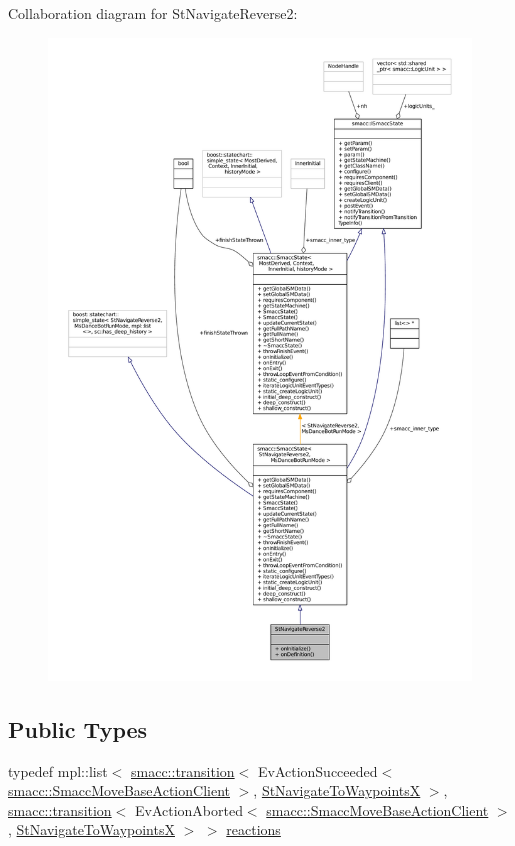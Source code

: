 Collaboration diagram for St\+Navigate\+Reverse2\+:
\nopagebreak
\begin{figure}[H]
\begin{center}
\leavevmode
\includegraphics[width=350pt]{structStNavigateReverse2__coll__graph}
\end{center}
\end{figure}
\subsection*{Public Types}
\begin{DoxyCompactItemize}
\item 
typedef mpl\+::list$<$ \hyperlink{classsmacc_1_1transition}{smacc\+::transition}$<$ Ev\+Action\+Succeeded$<$ \hyperlink{classsmacc_1_1SmaccMoveBaseActionClient}{smacc\+::\+Smacc\+Move\+Base\+Action\+Client} $>$, \hyperlink{structStNavigateToWaypointsX}{St\+Navigate\+To\+WaypointsX} $>$, \hyperlink{classsmacc_1_1transition}{smacc\+::transition}$<$ Ev\+Action\+Aborted$<$ \hyperlink{classsmacc_1_1SmaccMoveBaseActionClient}{smacc\+::\+Smacc\+Move\+Base\+Action\+Client} $>$, \hyperlink{structStNavigateToWaypointsX}{St\+Navigate\+To\+WaypointsX} $>$ $>$ \hyperlink{structStNavigateReverse2_af0a697d39c2eef15955e3a2653009b3b}{reactions}
\end{DoxyCompactItemize}
